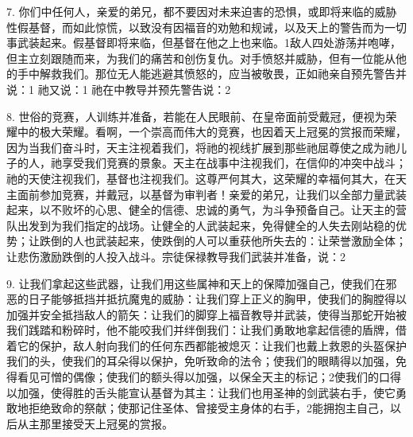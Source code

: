 7. 你们中任何人，亲爱的弟兄，都不要因对未来迫害的恐惧，或即将来临的威胁性假基督，而如此惊慌，以致没有因福音的劝勉和规诫，以及天上的警告而为一切事武装起来。假基督即将来临，但基督在他之上也来临。1敌人四处游荡并咆哮，但主立刻跟随而来，为我们的痛苦和创伤复仇。对手愤怒并威胁，但有一位能从他的手中解救我们。那位无人能逃避其愤怒的，应当被敬畏，正如祂亲自预先警告并说：1 祂又说：1 祂在中教导并预先警告说：2\par

8. 世俗的竞赛，人训练并准备，若能在人民眼前、在皇帝面前受戴冠，便视为荣耀中的极大荣耀。看啊，一个崇高而伟大的竞赛，也因着天上冠冕的赏报而荣耀，因为当我们奋斗时，天主注视着我们，将祂的视线扩展到那些祂屈尊使之成为祂儿子的人，祂享受我们竞赛的景象。天主在战事中注视我们，在信仰的冲突中战斗；祂的天使注视我们，基督也注视我们。这尊严何其大，这荣耀的幸福何其大，在天主面前参加竞赛，并戴冠，以基督为审判者！亲爱的弟兄，让我们以全部力量武装起来，以不败坏的心思、健全的信德、忠诚的勇气，为斗争预备自己。让天主的营队出发到为我们指定的战场。让健全的人武装起来，免得健全的人失去刚站稳的优势；让跌倒的人也武装起来，使跌倒的人可以重获他所失去的：让荣誉激励全体；让悲伤激励跌倒的人投入战斗。宗徒保禄教导我们武装并准备，说：2\par

9. 让我们拿起这些武器，让我们用这些属神和天上的保障加强自己，使我们在邪恶的日子能够抵挡并抵抗魔鬼的威胁：让我们穿上正义的胸甲，使我们的胸膛得以加强并安全抵挡敌人的箭矢：让我们的脚穿上福音教导并武装，使得当那蛇开始被我们践踏和粉碎时，他不能咬我们并绊倒我们：让我们勇敢地拿起信德的盾牌，借着它的保护，敌人射向我们的任何东西都能被熄灭：让我们也戴上救恩的头盔保护我们的头，使我们的耳朵得以保护，免听致命的法令；使我们的眼睛得以加强，免得看见可憎的偶像；使我们的额头得以加强，以保全天主的标记；2使我们的口得以加强，使得胜的舌头能宣认基督为其主：让我们也用圣神的剑武装右手，使它勇敢地拒绝致命的祭献；使那记住圣体、曾接受主身体的右手，2能拥抱主自己，以后从主那里接受天上冠冕的赏报。\par

